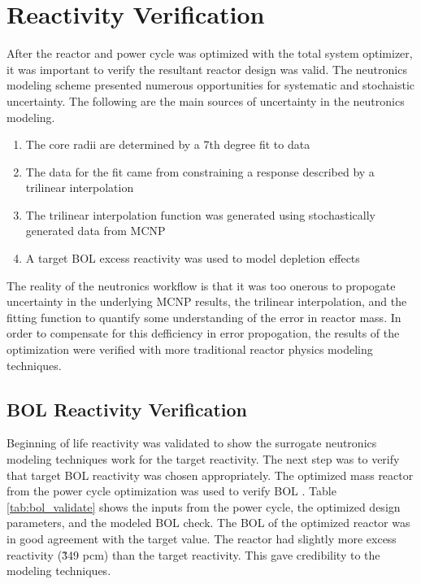 \section{Reactivity Verification}
After the reactor and power cycle was optimized with the total system optimizer,
it was important to verify the resultant reactor design was valid. The
neutronics modeling scheme presented numerous opportunities for systematic and
stochaistic uncertainty. The following are the main sources
of uncertainty in the neutronics modeling.

\onehalfspacing
\begin{enumerate}
    \item The core radii are determined by a 7th degree fit to data
    \item The data for the fit came from constraining a \keff response described
        by a trilinear interpolation
    \item The trilinear interpolation function was generated using stochastically
        generated \keff data from MCNP
    \item A target BOL excess reactivity was used to model depletion effects
\end{enumerate}
\doublespacing

The reality of the neutronics workflow is that it was too onerous to propogate
uncertainty in the underlying MCNP results, the trilinear interpolation, and the
fitting function to quantify some understanding of the error in reactor mass. In
order to compensate for this defficiency in error propogation, the results of
the optimization were verified with more traditional reactor physics modeling
techniques.

\subsection{BOL Reactivity Verification}
Beginning of life reactivity was validated to show the surrogate neutronics
modeling techniques work for the target reactivity. The next step was to verify
that target BOL reactivity was chosen appropriately. The optimized mass reactor
from the power cycle optimization was used to verify BOL \keff. Table
\ref{tab:bol_validate} shows the inputs from the power cycle, the optimized
design parameters, and the modeled BOL \keff check. The BOL \keff of the optimized reactor
was in good agreement with the target value. 
The reactor had slightly more excess reactivity (\~349 pcm) than the
target reactivity. This gave credibility to the \keff modeling techniques.

